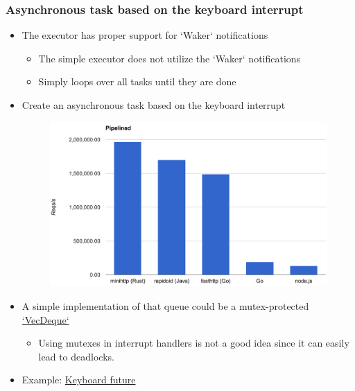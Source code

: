 \begin{frame}[fragile]
    \frametitle{Asynchronous task based on the keyboard interrupt}
% 
% 
    \begin{itemize}
        \item The executor has proper support for `Waker` notifications
    	\begin{itemize}
    	    \item The simple executor does not utilize the `Waker` notifications
    	    \item Simply loops over all tasks until they are done
    	\end{itemize}

        \item Create an asynchronous task based on the keyboard interrupt
% 
    \begin{figure}
    \includegraphics[width=0.8\linewidth]{figs/bench-pipelined.png}
    \end{figure}

        \item A simple implementation of that queue could be a mutex-protected \href{https://doc.rust-lang.org/stable/alloc/collections/vec_deque/struct.VecDeque.html}{`VecDeque`}
    	\begin{itemize}
    	    \item Using mutexes in interrupt handlers is not a good idea since it can easily lead to deadlocks.
    	\end{itemize}

        \item Example: \href{https://github.com/phil-opp/blog_os/blob/post-12/src/task/keyboard.rs}{Keyboard future}
    \end{itemize}

\end{frame}
